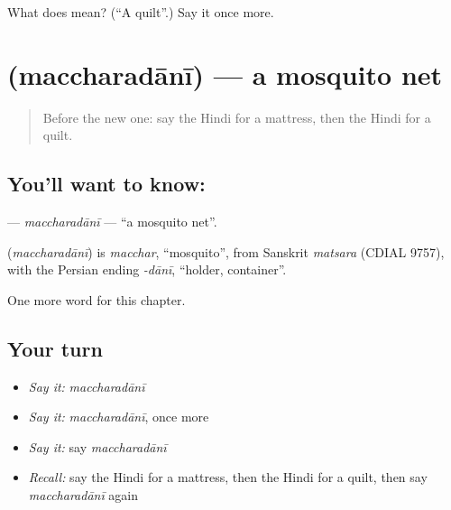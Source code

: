 \begin{tcolorbox}[breakable,colback=teal!4,colframe=teal!35!black,title={Before you move on}]
What does  mean? (\textquotedblleft{}A quilt\textquotedblright{}.) Say it once more.
\end{tcolorbox}
\section[\texorpdfstring{\hi{मच्छरदानी} (maccharadānī)}{मच्छरदानी (maccharadānī)}]{ (maccharadānī) — a mosquito net}

\label{lesson:HI-C267-maccharadani}



\begin{quote}
Before the new one: say the Hindi for a mattress, then the Hindi for a quilt.
\end{quote}

\subsection*{You'll want to know: }
\textbf{} — \emph{maccharadānī} — \textquotedblleft{}a mosquito net\textquotedblright{}.

\begin{cousinweb}
\textbf{} (\emph{maccharadānī}) is \emph{macchar}, \textquotedblleft{}mosquito\textquotedblright{}, from Sanskrit \emph{matsara} (CDIAL 9757), with the Persian ending \emph{-dānī}, \textquotedblleft{}holder, container\textquotedblright{}.
\end{cousinweb}

\begin{grammarlens}[title={What you've built}]
One more word for this chapter.
\end{grammarlens}

\subsection*{Your turn}
\begin{itemize}
\raggedright
  \item \emph{Say it:} \emph{maccharadānī}
  \item \emph{Say it:} \emph{maccharadānī}, once more
  \item \emph{Say it:} say \emph{maccharadānī}
  \item \emph{Recall:} say the Hindi for a mattress, then the Hindi for a quilt, then say \emph{maccharadānī} again
\end{itemize}

